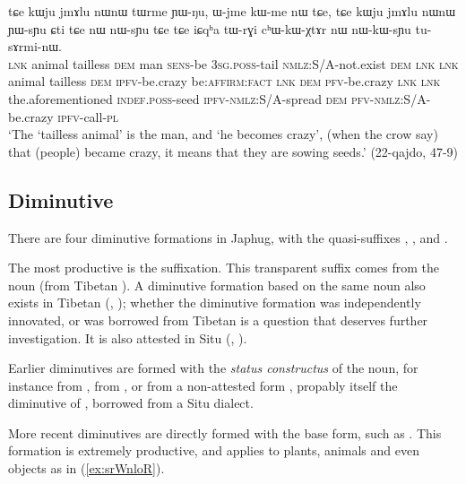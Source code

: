 \begin{exe}
\ex \label{ex:jmAlu}
\gll tɕe kɯju jmɤlu nɯnɯ tɯrme ɲɯ-ŋu, ɯ-jme kɯ-me nɯ tɕe, tɕe kɯju jmɤlu nɯnɯ ɲɯ-sɲu ɕti tɕe nɯ  nɯ-sɲu tɕe tɕe iɕqʰa tɯ-rɣi cʰɯ-kɯ-χtɤr nɯ nɯ-kɯ-sɲu tu-sɤrmi-nɯ. \\
\textsc{lnk} animal tailless \textsc{dem} man \textsc{sens}-be \textsc{3sg.poss}-tail \textsc{nmlz}:S/A-not.exist \textsc{dem} \textsc{lnk} \textsc{lnk} animal tailless  \textsc{dem} \textsc{ipfv}-be.crazy  be:\textsc{affirm}:\textsc{fact} \textsc{lnk} \textsc{dem} \textsc{pfv}-be.crazy \textsc{lnk} \textsc{lnk} the.aforementioned \textsc{indef.poss}-seed \textsc{ipfv}-\textsc{nmlz}:S/A-spread \textsc{dem} \textsc{pfv}-\textsc{nmlz}:S/A-be.crazy \textsc{ipfv}-call-\textsc{pl} \\
\glt `The `tailless animal' is the man, and `he becomes crazy', (when the crow say) that (people) became crazy, it means that they are sowing seeds.' (22-qajdo, 47-9)
\end{exe}

\subsection{Diminutive} \label{sec:diminutive}
There are four diminutive formations in Japhug, with the quasi-suffixes , ,  and .

The most productive is the  suffixation. This transparent suffix comes from the noun  (from Tibetan ). A diminutive formation based on the same noun also exists in Tibetan (\citealt{uray52diminutive},  \citealt[627]{hill14derivational}); whether the diminutive formation was independently innovated, or was borrowed from Tibetan is a question that deserves further investigation. It is also attested in Situ (\citealt{zhang16bragdbar}, \citealt[151]{lai17khroskyabs}).

Earlier diminutives are formed with the\textit{ status constructus} of the noun, for instance  from ,  from , or  from a non-attested form , propably itself the  diminutive of , borrowed from a Situ dialect.

More recent diminutives are directly formed with the base form, such as . This formation is extremely productive, and applies to plants, animals and even objects as in (\ref{ex:srWnloR}).

